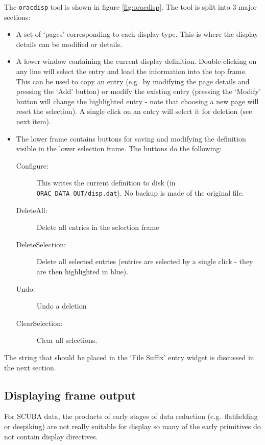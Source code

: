 \documentclass[twoside,11pt,nolof]{starlink}
\begin{document}
The \texttt{oracdisp} tool is shown in figure \ref{fig:oracdisp}. The
tool is split into 3 major sections:

\begin{itemize}
\item A set of `pages' corresponding to each display type. This is where
the display details can be modified or details.
\item A lower window containing the current display
definition. Double-clicking on any line will select the entry and load the
information into the top frame. This can be used to copy an entry (e.g.\
by modifying the page details and pressing the `Add' button) or
modify the existing entry (pressing the `Modify' button will change the
highlighted entry - note that choosing a new page will reset the
selection). A single click on an entry will select it for deletion (see next item).

\item  The lower frame contains buttons for saving and modifying the
definition visible in the lower selection frame. The buttons do the following:
\begin{description}
\item[Configure:] This writes the current definition to disk (in
\texttt{ORAC\_DATA\_OUT/disp.dat}). No backup is made of the original file.
\item[DeleteAll:] Delete all entries in the selection frame
\item[DeleteSelection:] Delete all selected entries (entries are selected by a
single click - they are then highlighted in blue).
\item[Undo:] Undo a deletion
\item[ClearSelection:] Clear all selections.

\end{description}
\end{itemize}

The string that should be placed in the `File Suffix' entry
widget is discussed in the next section.

\subsection{Displaying frame output}

For SCUBA data, the products of early stages of data reduction
(e.g.\ flatfielding or despiking) are not really suitable for display
so many of the early primitives do not contain display directives.
\end{document}
